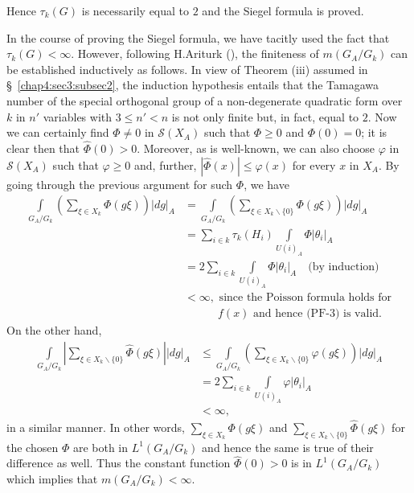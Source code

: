 Hence $\tau_{k}(G)$ is necessarily equal to $2$ and the Siegel formula
is proved. 

\begin{Remark*}
  In the course of proving the Siegel formula, we have tacitly used the
  fact that $\tau_{k}(G)<\infty$. However, following H.\@ Ariturk
  (\cite{Ari}), the finiteness of $m(G_{A}/G_{k})$ can be established
  inductively as follows. In view of Theorem (iii) assumed in
  \S\ \ref{chap4:sec3:subsec2}, the induction hypothesis entails that the Tamagawa
  number of the special orthogonal group of a non-degenerate quadratic
  form over $k$ in $n'$ variables with $3\leq n'<n$ is not only finite
  but, in fact, equal to $2$. Now we can certainly find $\Phi\neq 0$ in
  $\mathscr{S}(X_{A})$ such that $\Phi\geq 0$ and $\Phi(0)=0$; it is clear
  then that $\hat{\Phi}(0)>0$. Moreover, as is well-known, we can
  also choose $\varphi$ in $\mathscr{S}(X_{A})$ such that $\varphi\geq 0$
  and, further, $|\hat{\Phi}(x)|\leq \varphi(x)$ for every $x$ in
  $X_{A}$. By going through the previous argument for such $\Phi$, we
  have
  \begin{align*}
    \int\limits_{G_{A}/G_{k}}\left(\sum_{\xi\in
      X_{k}}\Phi(g\xi)\right)|dg|_{A} &=
    \int\limits_{G_{A}/G_{k}}\left(\sum_{\xi\in X_{k}\backslash \{
      0\}}\Phi(g\xi)\right)|dg|_{A}\\ 
    &= \sum_{i\in
      k}\tau_{k}(H_{i})\int\limits_{U(i)_{A}}\Phi|\theta_{i}|_{A}\\
    &= 2\sum_{i\in
      k}\int\limits_{U(i)_{A}}\Phi|\theta_{i}|_{A}\quad\text{(by
      induction)}\\
    &<\infty, \text{ since the Poisson formula holds for}\\
    &\qquad\quad \text{$f(x)$ and hence (PF-3) is valid.}
  \end{align*}\pageoriginale
  On the other hand,
  \begin{align*}
    \int\limits_{G_{A}/G_{k}}\left|\sum_{\xi\in
      X_{k}\backslash\{0\}}\hat{\Phi}(g\xi)\right||dg|_{A} & \leq
    \int\limits_{G_{A}/G_{k}}\left(\sum_{\xi\in
      X_{k}\backslash\{0\}}\varphi(g\xi)\right)|dg|_{A}\\ 
    &= 2\sum_{i\in k}\int\limits_{U(i)_{A}}\varphi|\theta_{i}|_{A}\\
    &<\infty,
  \end{align*}
  in a similar manner. In other words, $\sum\limits_{\xi\in
    X_{k}}\Phi(g\xi)$ and $\sum\limits_{\xi\in
    X_{k}\backslash\{0\}}\hat{\Phi}(g\xi)$ for the chosen $\Phi$ are
  both in $L^{1}(G_{A}/G_{k})$ and hence the same is true of their
  difference as well. Thus the constant function $\hat{\Phi}(0)>0$
  is in $L^{1}(G_{A}/G_{k})$ which implies that $m(G_{A}/G_{k})<\infty$.
\end{Remark*}

